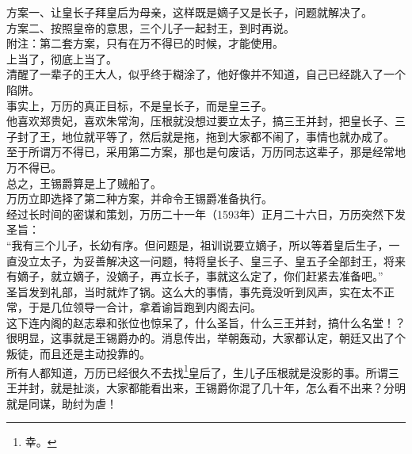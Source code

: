 \begin{multicols}{\theparacolNo}
方案一、让皇长子拜皇后为母亲，这样既是嫡子又是长子，问题就解决了。\\

方案二、按照皇帝的意思，三个儿子一起封王，到时再说。\\

附注：第二套方案，只有在万不得已的时候，才能使用。\\

上当了，彻底上当了。\\

清醒了一辈子的王大人，似乎终于糊涂了，他好像并不知道，自己已经跳入了一个陷阱。\\

事实上，万历的真正目标，不是皇长子，而是皇三子。\\

他喜欢郑贵妃，喜欢朱常洵，压根就没想过要立太子，搞三王并封，把皇长子、三子封了王，地位就平等了，然后就是拖，拖到大家都不闹了，事情也就办成了。\\

至于所谓万不得已，采用第二方案，那也是句废话，万历同志这辈子，那是经常地万不得已。\\

总之，王锡爵算是上了贼船了。\\

万历立即选择了第二种方案，并命令王锡爵准备执行。\\

经过长时间的密谋和策划，万历二十一年（1593年）正月二十六日，万历突然下发圣旨：\\

“我有三个儿子，长幼有序。但问题是，祖训说要立嫡子，所以等着皇后生子，一直没立太子，为妥善解决这一问题，特将皇长子、皇三子、皇五子全部封王，将来有嫡子，就立嫡子，没嫡子，再立长子，事就这么定了，你们赶紧去准备吧。”\\

圣旨发到礼部，当时就炸了锅。这么大的事情，事先竟没听到风声，实在太不正常，于是几位领导一合计，拿着谕旨跑到内阁去问。\\

这下连内阁的赵志皋和张位也惊呆了，什么圣旨，什么三王并封，搞什么名堂！？\\

很明显，这事就是王锡爵办的。消息传出，举朝轰动，大家都认定，朝廷又出了个叛徒，而且还是主动投靠的。\\

所有人都知道，万历已经很久不去找\footnote{幸。}皇后了，生儿子压根就是没影的事。所谓三王并封，就是扯淡，大家都能看出来，王锡爵你混了几十年，怎么看不出来？分明就是同谋，助纣为虐！\\


\end{multicols}
